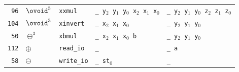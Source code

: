 \documentclass{article}
\begin{document}
{\begin{tabular}{rllll}
    \texttt{ 96} & $\ovoid^3$    & \texttt{xxmul}                                     & \texttt{\_ y$_2$ y$_1$ y$_0$ x$_2$ x$_1$ x$_0$}                           & \texttt{\_ y$_2$ y$_1$ y$_0$ z$_2$ z$_1$ z$_0$}                            \\
    \texttt{104} & $\ovoid^3$    & \texttt{xinvert}                                   & \texttt{\_ x$_2$ x$_1$ x$_0$}                                             & \texttt{\_ y$_2$ y$_1$ y$_0$}                                              \\
    \texttt{ 50} & $\ominus^3$   & \texttt{xbmul}                                     & \texttt{\_ x$_2$ x$_1$ x$_0$ b}                                           & \texttt{\_ y$_2$ y$_1$ y$_0$}                                              \\
    \texttt{112} & $\oplus$      & \texttt{read\_io}                                  & \texttt{\_}                                                               & \texttt{\_ a}                                                              \\
    \texttt{ 58} & $\ominus$     & \texttt{write\_io}                                 & \texttt{\_ st$_0$}                                                        & \texttt{\_}
\end{tabular}
}
\end{document}
